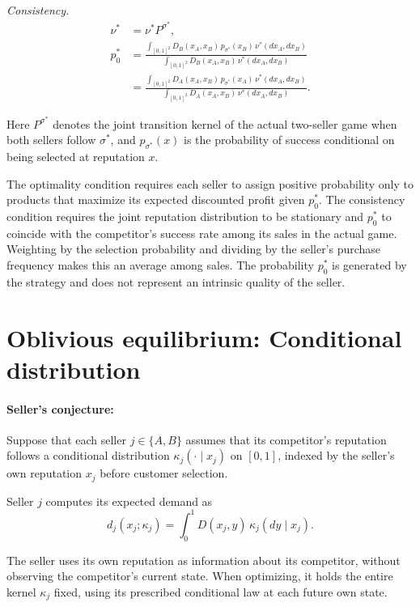 \documentclass[11pt]{article}
\begin{document}
\textit{Consistency.}
\begin{equation}
\begin{aligned}
\nu^*&=\nu^*P^{\sigma^*},\\
p_0^*
&=
\frac{\displaystyle\int_{[0,1]^2}
D_B(x_A,x_B)\,p_{\sigma^*}(x_B)\,\nu^*(dx_A,dx_B)}
{\displaystyle\int_{[0,1]^2}
D_B(x_A,x_B)\,\nu^*(dx_A,dx_B)}\\
&=
\frac{\displaystyle\int_{[0,1]^2}
D_A(x_A,x_B)\,p_{\sigma^*}(x_A)\,\nu^*(dx_A,dx_B)}
{\displaystyle\int_{[0,1]^2}
D_A(x_A,x_B)\,\nu^*(dx_A,dx_B)}.
\end{aligned}
\end{equation}

Here $P^{\sigma^*}$ denotes the joint transition kernel
of the actual two-seller game when both sellers follow
$\sigma^*$, and $p_{\sigma^*}(x)$ is the probability of
success conditional on being selected at reputation $x$.

The optimality condition requires each seller to assign
positive probability only to products that maximize its
expected discounted profit given $p_0^*$. The consistency
condition requires the joint reputation distribution to
be stationary and $p_0^*$ to coincide with the competitor's
success rate among its sales in the actual game. Weighting
by the selection probability and dividing by the seller's
purchase frequency makes this an average among sales.
The probability $p_0^*$ is generated by the strategy and
does not represent an intrinsic quality of the seller.

\section{Oblivious equilibrium: Conditional distribution}

\paragraph{Seller's conjecture:}
Suppose that each seller $j\in\{A,B\}$ assumes that
its competitor's reputation follows a conditional distribution
$\kappa_j(\cdot\mid x_j)$ on $[0,1]$, indexed by the
seller's own reputation $x_j$ before customer selection.

Seller $j$ computes its expected demand as
\begin{equation}
d_j(x_j;\kappa_j)
=
\int_0^1 D(x_j,y)\,\kappa_j(dy\mid x_j).
\end{equation}

The seller uses its own reputation as information about
its competitor, without observing the competitor's current
state. When optimizing, it holds the entire kernel $\kappa_j$
fixed, using its prescribed conditional law at each future
own state.
\end{document}
